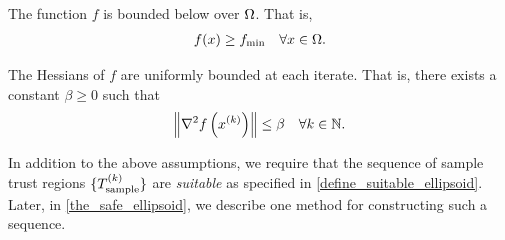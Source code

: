 \documentclass{article}
\begin{document}



\begin{assumption}
\label{lower_bound}
The function $f$ is bounded below over $\Omega$.
That is,
\begin{align}
f(x) \ge f_{\text{min}} \quad \forall x \in \Omega.
\end{align}
\end{assumption}




\begin{assumption}
\label{uniformly_bounded_hessians_of_f}
The Hessians of $f$ are uniformly bounded at each iterate. That is, there exists a constant $\beta \ge 0$ such that
\begin{align*}
\left\|\nabla^2 f\left(x^{(k)}\right)\right\| \le \beta \quad \forall k \in \mathbb N.
\end{align*}
\end{assumption}

In addition to the above assumptions,  we require that the sequence of sample trust regions $\{{T_{\text{sample}}^{(k)}}\}$ are \emph{suitable} as specified in \cref{define_suitable_ellipsoid}.   
  Later, in \cref{the_safe_ellipsoid}, we describe one method for constructing such a sequence.


\end{document}
